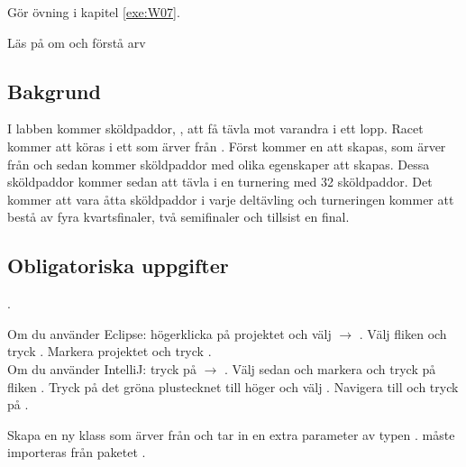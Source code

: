 

\Teamlab{\LabWeekSEVEN}

\begin{Goals}

\end{Goals}

\begin{Preparations}
\item Gör övning {\tt \ExeWeekSEVEN} i kapitel \ref{exe:W07}.
\item Läs på om och förstå arv

\end{Preparations}

\subsection{Bakgrund}
I labben kommer sköldpaddor, , att få tävla mot varandra i ett lopp. Racet kommer att köras i ett  som ärver från . Först kommer en  att skapas, som ärver från  och sedan kommer sköldpaddor med olika egenskaper att skapas. Dessa sköldpaddor kommer sedan att tävla i en turnering med 32 sköldpaddor. Det kommer att vara åtta sköldpaddor i varje deltävling och turneringen kommer att bestå av fyra kvartsfinaler, två semifinaler och tillsist en final.

\subsection{Obligatoriska uppgifter}

\Task {}.

\Subtask Om du använder Eclipse: högerklicka på projektet  och välj  $\rightarrow$ . Välj fliken  och tryck . Markera projektet  och tryck . \\
Om du använder IntelliJ: tryck på  $\rightarrow$ . Välj sedan  och markera  och tryck på fliken . Tryck på det gröna plustecknet till höger och välj . Navigera till  och tryck på .

\Subtask Skapa en ny klass  som ärver från  och tar in en extra parameter  av typen .  måste importeras från paketet .

